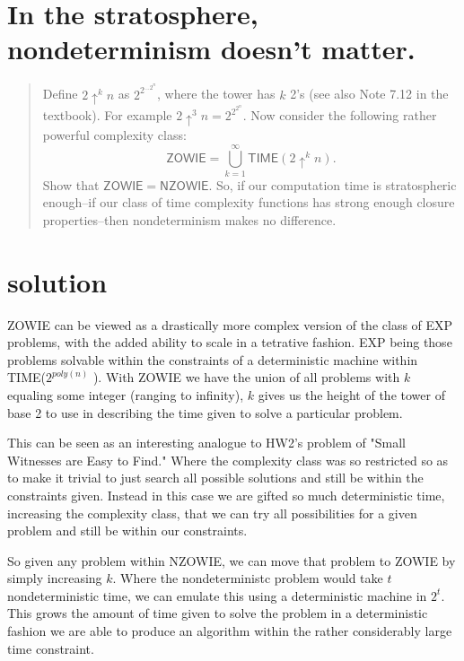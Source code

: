 

\maketitle
\thispagestyle{firststyle}
\vspace{-2.0cm}

\section{In the stratosphere, nondeterminism doesn’t matter.}
    \begin{quote}
    Define $2\uparrow^k n$ as $2^{2^{...2^n}}$, where the tower has $k$ 2's (see also Note 7.12 in the textbook).
    For example $2 \uparrow^3 n = 2^{2^{2^n}}$.
    Now consider the following rather powerful complexity class:
    \[
        \mathsf{ZOWIE} =
        \bigcup_{k=1}^\infty \mathsf{TIME}(2\uparrow^k n).
    \]
    Show that $\mathsf{ZOWIE} = \mathsf{NZOWIE}$.
    So, if our computation time is stratospheric enough--if our class of time complexity functions has strong enough closure properties--then nondeterminism makes no difference.
    \end{quote}
    
\section*{solution}


ZOWIE can be viewed as a drastically more complex version of the class of EXP problems, with the added ability to scale in a tetrative fashion. EXP being those problems solvable within the constraints of a deterministic machine within TIME($2^{poly(n)}$ ). With ZOWIE we have the union of all problems with $k$ equaling some integer (ranging to infinity), $k$ gives us the height of the tower of base 2 to use in describing the time given to solve a particular problem. 

This can be seen as an interesting analogue to HW2's problem of "Small Witnesses are Easy to Find." Where the complexity class was so restricted so as to make it trivial to just search all possible solutions and still be within the constraints given. Instead in this case we are gifted so much deterministic time, increasing the complexity class, that we can try all possibilities for a given problem and still be within our constraints. 

So given any problem within NZOWIE, we can move that problem to ZOWIE by simply increasing $k$. Where the nondeterministc problem would take $t$ nondeterministic time, we can emulate this using a deterministic machine in $2^{t}$. 
This grows the amount of time given to solve the problem in a deterministic fashion we are able to produce an algorithm within the rather considerably large time constraint. 
  
    
    
    

